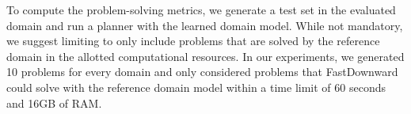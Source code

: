 

%
To compute the problem-solving metrics, we generate a test set \ptest in the evaluated domain and run a planner with the learned domain model. 
While not mandatory, we suggest limiting \ptest to only include problems that are solved by the reference domain in the allotted computational resources. 
In our experiments, we generated 10 problems for every domain and only considered problems that FastDownward could solve with the reference domain model within a time limit of 60 seconds and 16GB of RAM. %





%


